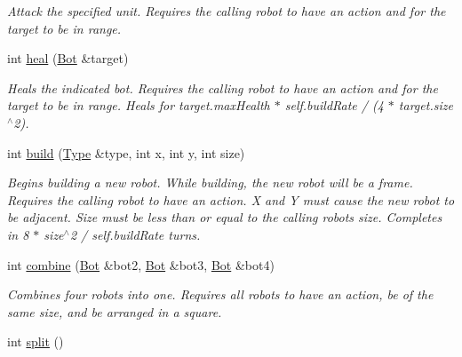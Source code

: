\begin{DoxyCompactItemize}
\begin{DoxyCompactList}\small\item\em Attack the specified unit. Requires the calling robot to have an action and for the target to be in range. \item\end{DoxyCompactList}\item 
\hypertarget{classBot_afac1a68fc38adf0384730d08e6e73c45}{
int \hyperlink{classBot_afac1a68fc38adf0384730d08e6e73c45}{heal} (\hyperlink{classBot}{Bot} \&target)}
\label{classBot_afac1a68fc38adf0384730d08e6e73c45}

\begin{DoxyCompactList}\small\item\em Heals the indicated bot. Requires the calling robot to have an action and for the target to be in range. Heals for target.maxHealth $\ast$ self.buildRate / (4 $\ast$ target.size$^\wedge$2). \item\end{DoxyCompactList}\item 
\hypertarget{classBot_a705ebce4a19f93bf6d8edc02fb70f1f7}{
int \hyperlink{classBot_a705ebce4a19f93bf6d8edc02fb70f1f7}{build} (\hyperlink{classType}{Type} \&type, int x, int y, int size)}
\label{classBot_a705ebce4a19f93bf6d8edc02fb70f1f7}

\begin{DoxyCompactList}\small\item\em Begins building a new robot. While building, the new robot will be a frame. Requires the calling robot to have an action. X and Y must cause the new robot to be adjacent. Size must be less than or equal to the calling robots size. Completes in 8 $\ast$ size$^\wedge$2 / self.buildRate turns. \item\end{DoxyCompactList}\item 
\hypertarget{classBot_a9e0de3afc7548e660818e937125fb76d}{
int \hyperlink{classBot_a9e0de3afc7548e660818e937125fb76d}{combine} (\hyperlink{classBot}{Bot} \&bot2, \hyperlink{classBot}{Bot} \&bot3, \hyperlink{classBot}{Bot} \&bot4)}
\label{classBot_a9e0de3afc7548e660818e937125fb76d}

\begin{DoxyCompactList}\small\item\em Combines four robots into one. Requires all robots to have an action, be of the same size, and be arranged in a square. \item\end{DoxyCompactList}\item 
\hypertarget{classBot_ad710db985160136aa8e3c624b26afc4e}{
int \hyperlink{classBot_ad710db985160136aa8e3c624b26afc4e}{split} ()}
\label{classBot_ad710db985160136aa8e3c624b26afc4e}


\end{DoxyCompactItemize}
